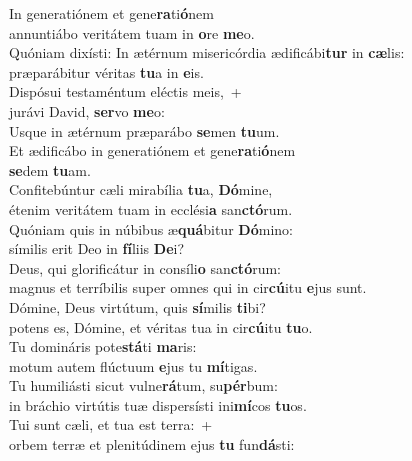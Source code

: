 \evenverse In generatiónem et gene\textbf{ra}ti\textbf{ó}nem~\*\\
\evenverse annuntiábo veritátem tuam in \textbf{o}re \textbf{me}o.\\
\oddverse Quóniam dixísti: In ætérnum misericórdia ædificábi\textbf{tur} in \textbf{cæ}lis:~\*\\
\oddverse præparábitur véritas \textbf{tu}a in \textbf{e}is.\\
\evenverse Dispósui testaméntum eléctis meis,~+\\
\evenverse  jurávi David, \textbf{ser}vo \textbf{me}o:~\*\\
\evenverse Usque in ætérnum præparábo \textbf{se}men \textbf{tu}um.\\
\oddverse Et ædificábo in generatiónem et gene\textbf{ra}ti\textbf{ó}nem~\*\\
\oddverse \textbf{se}dem \textbf{tu}am.\\
\evenverse Confitebúntur cæli mirabília \textbf{tu}a, \textbf{Dó}mine,~\*\\
\evenverse étenim veritátem tuam in ecclési\textbf{a} san\textbf{ctó}rum.\\
\oddverse Quóniam quis in núbibus æ\textbf{quá}bitur \textbf{Dó}mino:~\*\\
\oddverse símilis erit Deo in \textbf{fí}liis \textbf{De}i?\\
\evenverse Deus, qui glorificátur in consíli\textbf{o} san\textbf{ctó}rum:~\*\\
\evenverse magnus et terríbilis super omnes qui in cir\textbf{cú}itu \textbf{e}jus sunt.\\
\oddverse Dómine, Deus virtútum, quis \textbf{sí}milis \textbf{ti}bi?~\*\\
\oddverse potens es, Dómine, et véritas tua in cir\textbf{cú}itu \textbf{tu}o.\\
\evenverse Tu domináris pote\textbf{stá}ti \textbf{ma}ris:~\*\\
\evenverse motum autem flúctuum \textbf{e}jus tu \textbf{mí}tigas.\\
\oddverse Tu humiliásti sicut vulne\textbf{rá}tum, su\textbf{pér}bum:~\*\\
\oddverse in bráchio virtútis tuæ dispersísti ini\textbf{mí}cos \textbf{tu}os.\\
\evenverse Tui sunt cæli, et tua est terra:~+\\
\evenverse  orbem terræ et plenitúdinem ejus \textbf{tu} fun\textbf{dá}sti:~\*\\
